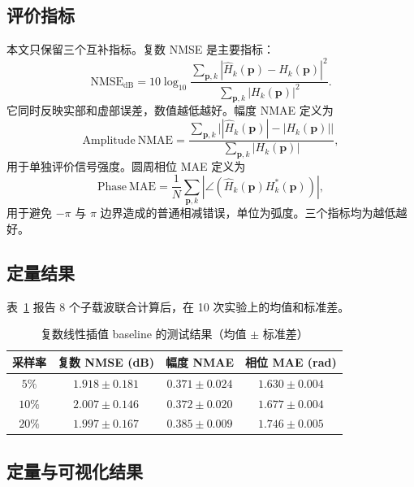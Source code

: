 \documentclass[UTF8,a4paper,11pt]{ctexart}
\begin{document}
\subsection{评价指标}

本文只保留三个互补指标。复数 NMSE 是主要指标：
\begin{equation}
    \mathrm{NMSE}_{\mathrm{dB}}=
    10\log_{10}
    \frac{\sum_{\mathbf p,k}|\hat H_k(\mathbf p)-H_k(\mathbf p)|^2}
    {\sum_{\mathbf p,k}|H_k(\mathbf p)|^2}.
\end{equation}
它同时反映实部和虚部误差，数值越低越好。幅度 NMAE 定义为
\begin{equation}
    \mathrm{Amplitude\ NMAE}=
    \frac{\sum_{\mathbf p,k}\bigl||\hat H_k(\mathbf p)|-|H_k(\mathbf p)|\bigr|}
    {\sum_{\mathbf p,k}|H_k(\mathbf p)|},
\end{equation}
用于单独评价信号强度。圆周相位 MAE 定义为
\begin{equation}
    \mathrm{Phase\ MAE}=
    \frac{1}{N}\sum_{\mathbf p,k}
    \left|\angle\!\left(\hat H_k(\mathbf p)H_k^*(\mathbf p)\right)\right|,
\end{equation}
用于避免 $-\pi$ 与 $\pi$ 边界造成的普通相减错误，单位为弧度。三个指标均为越低越好。

\subsection{定量结果}

表~\ref{tab:baseline-results} 报告 8 个子载波联合计算后，在 10 次实验上的均值和标准差。

\begin{table}[H]
    \centering
    \small
    \caption{复数线性插值 baseline 的测试结果（均值 $\pm$ 标准差）}
    \label{tab:baseline-results}
    \begin{tabular}{cccc}
        \toprule
        采样率 & 复数 NMSE (dB) & 幅度 NMAE & 相位 MAE (rad) \\
        \midrule
        $5\%$  & $1.918\pm0.181$ & $0.371\pm0.024$ & $1.630\pm0.004$ \\
        $10\%$ & $2.007\pm0.146$ & $0.372\pm0.020$ & $1.677\pm0.004$ \\
        $20\%$ & $1.997\pm0.167$ & $0.385\pm0.009$ & $1.746\pm0.005$ \\
        \bottomrule
    \end{tabular}%
\end{table}

\subsection{定量与可视化结果}
\end{document}
